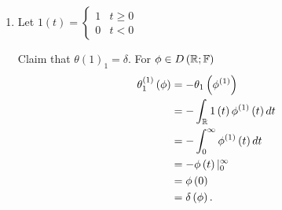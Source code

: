 \begin{eg}
	\begin{enumerate}
		\item Let $1\left( t \right) = \begin{cases}
				1 & t \ge 0 \\
				0 & t < 0
		\end{cases}$

		Claim that $\theta\left( 1 \right) _{1} = \delta$. For $\phi \in  D\left( \mathbb{R}; \mathbb{F} \right) $ 
		\begin{align*}
			\theta ^{\left( 1 \right) }_{1}\left( \phi \right) &= -\theta_{1}\left( \phi^{\left( 1 \right) } \right)  \\
									      &= -\int_{\mathbb{R}}^{ } 1\left( t \right) \phi^{\left( 1 \right) } \left( t \right) dt  \\
									      &= - \int_{0}^{\infty} \phi^{\left( 1 \right) }\left( t \right) dt \\
									      &= -\phi\left( t \right) | _{0}^{\infty} \\
									      &= \phi\left( 0 \right)  \\
									      &= \delta\left( \phi \right) 
		.\end{align*}


	\end{enumerate}
\end{eg}
